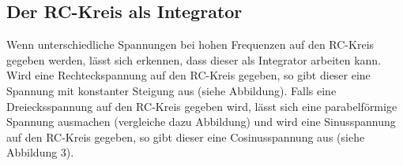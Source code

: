 \subsection{Der RC-Kreis als Integrator}

Wenn unterschiedliche Spannungen bei hohen Frequenzen auf den RC-Kreis gegeben werden, 
lässt sich erkennen, dass dieser als Integrator arbeiten kann. Wird eine Rechteckspannung
auf den RC-Kreis gegeben, so gibt dieser eine Spannung mit konstanter Steigung aus 
(siehe Abbildung). Falls eine Dreiecksspannung auf den RC-Kreis gegeben wird, lässt sich eine
parabelförmige Spannung ausmachen (vergleiche dazu Abbildung) und wird eine Sinusspannung auf den 
RC-Kreis gegeben, so gibt dieser eine Cosinusspannung aus (siehe Abbildung 3).

